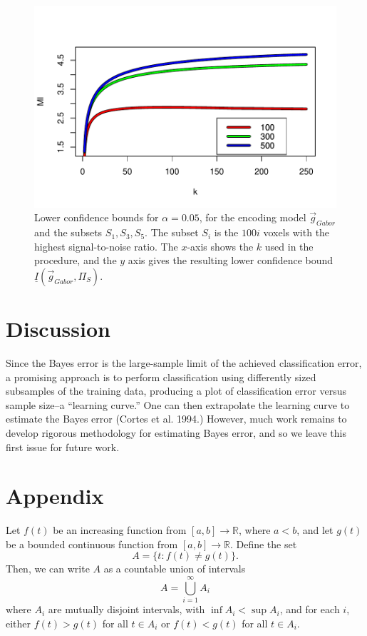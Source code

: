 \documentclass[12pt]{article}
\begin{document}
\begin{figure}[h]
\centering
\includegraphics[scale = 0.7]{../Yuval/lower_bound.pdf}
\caption{Lower confidence bounds for $\alpha = 0.05$, for the encoding model $\vec{g}_{Gabor}$ and the subsets $S_1,S_3, S_5$.
The subset $S_i$ is the $100i$ voxels with the highest signal-to-noise
ratio.  The $x$-axis shows the $k$ used in the procedure, and the $y$
axis gives the resulting lower confidence bound
$\underline{I}(\vec{g}_{Gabor}, \Pi_S)$.}\label{fig:kaydata1}
\end{figure}




\section{Discussion}

Since the Bayes error is the large-sample limit of the achieved
classification error, a promising approach is to perform
classification using differently sized subsamples of the training
data, producing a plot of classification error versus sample size--a
``learning curve.'' One can then extrapolate the learning curve to
estimate the Bayes error (Cortes et al. 1994.) However, much work
remains to develop rigorous methodology for estimating Bayes error,
and so we leave this first issue for future work.

\appendix
\section{Appendix}

\begin{lemma}\label{lemma:technical1}
Let $f(t)$ be an increasing function from $[a, b] \to \mathbb{R}$, where $a < b$,
and let $g(t)$ be a bounded continuous function from $[a, b] \to \mathbb{R}$.
Define the set
\[
A = \{t: f(t) \neq g(t)\}.
\]
Then, we can write $A$ as a countable union of intervals
\[
A = \bigcup_{i=1}^\infty A_i
\]
where $A_i$ are mutually disjoint intervals, with $\inf A_i < \sup
A_i$, and for each $i$, either $f(t) > g(t)$ for all $t \in A_i$ or
$f(t) < g(t)$ for all $t \in A_i$.
\end{lemma}
\end{document}
